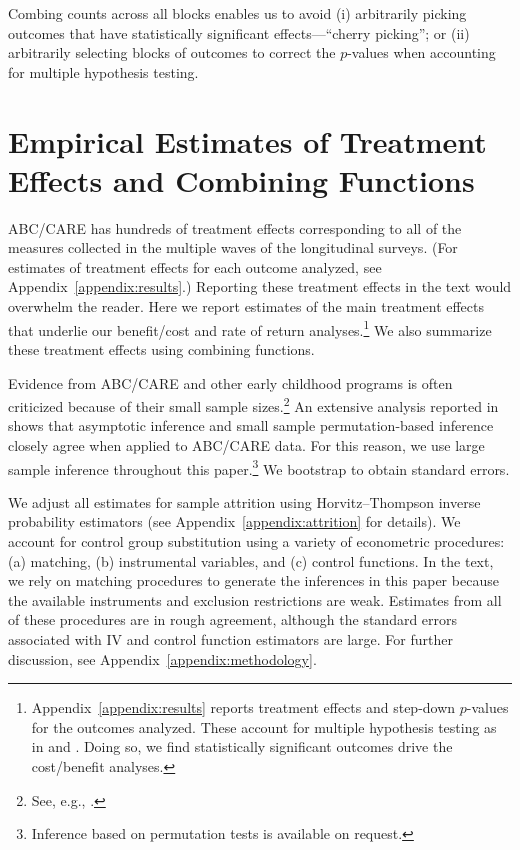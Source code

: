 Combing counts across all blocks enables us to avoid (i) arbitrarily picking outcomes that have statistically significant effects---``cherry picking''; or (ii) arbitrarily selecting blocks of outcomes to correct the $p$-values when accounting for multiple hypothesis testing.

\section{Empirical Estimates of Treatment Effects and Combining Functions}\label{section:c-functions}

ABC/CARE has hundreds of treatment effects corresponding to all of the measures collected in the multiple waves of the longitudinal surveys. (For estimates of treatment effects for each outcome analyzed, see Appendix~\ref{appendix:results}.) Reporting these treatment effects in the text would overwhelm the reader. Here we report estimates of the main treatment effects that underlie our benefit/cost and rate of return analyses.\footnote{Appendix~\ref{appendix:results} reports treatment effects and step-down  $p$-values for the outcomes analyzed. These account for multiple hypothesis testing as in \citet{Lehman_Romano_2005_AnnStat} and \citet{Romano_Shaikh_2006_AnnStat}. Doing so, we find statistically significant outcomes drive the cost/benefit analyses.} We also summarize these treatment effects using combining functions.

Evidence from ABC/CARE and other early childhood programs is often criticized because of their small sample sizes.\footnote{See, e.g., \cite{Murray_2013_GivingKids_JJHBOOK}.} An extensive analysis reported in \citet{Campbell_Conti_etal_2014_EarlyChildhoodInvestments} shows that asymptotic inference and small sample permutation-based inference closely agree when applied to ABC/CARE data. For this reason, we use large sample inference throughout this paper.\footnote{Inference based on permutation tests is available on request.} We bootstrap to obtain standard errors.

We adjust all estimates for sample attrition using Horvitz--Thompson \citeyear{Horvitz_Thompson_1952_JASA} inverse probability estimators (see Appendix~\ref{appendix:attrition} for details). We account for control group substitution using a variety of econometric procedures: (a) matching, (b) instrumental variables, and (c) control functions. In the text, we rely on matching procedures to generate the inferences in this paper because the available instruments and exclusion restrictions are weak. Estimates from all of these procedures are in rough agreement, although the standard errors associated with IV and control function estimators are large. For further discussion, see Appendix~\ref{appendix:methodology}.

